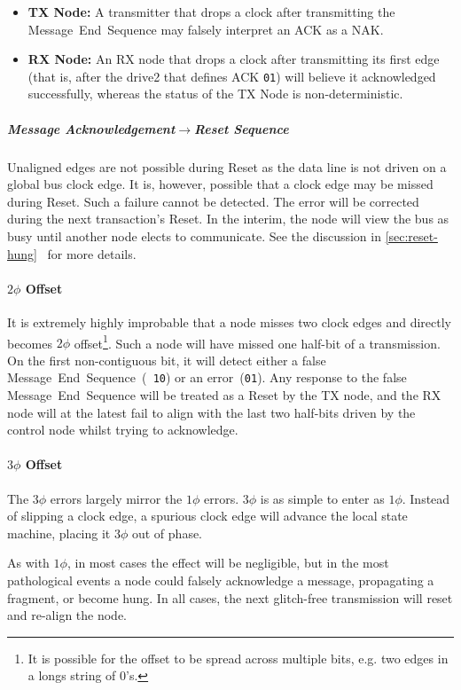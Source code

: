 \begin{itemize}
  \item {\bf TX Node:} A transmitter that drops a clock after transmitting the
Message~End~Sequence may falsely interpret an ACK as a NAK.

  \item {\bf RX Node:} An RX node that drops a clock after transmitting its
first edge (that is, after the {\sc drive2} that defines ACK {\tt 01}) will
believe it acknowledged successfully, whereas the status of the TX Node is
non-deterministic.
\end{itemize}

\subparagraph{Message Acknowledgement$\rightarrow$Reset Sequence}
Unaligned edges are not possible during Reset as the data line is not driven
on a global bus clock edge. It is, however, possible that a clock edge may be
missed during Reset. Such a failure cannot be detected. The error will be
corrected during the next transaction's Reset. In the interim, the node will
view the bus as busy until another node elects to communicate. See the
discussion in \ref{sec:reset-hung}~ for more details.


\paragraph{$2\phi$ Offset}
It is extremely highly improbable that a node misses two clock edges and
directly becomes $2\phi$ offset\footnote{
  It is possible for the offset to be spread across multiple bits, e.g.
  two edges in a longs string of 0's.}.
Such a node will have missed one half-bit of a transmission. On the first
non-contiguous bit, it will detect either a false Message~End~Sequence~({\tt
10}) or an error~({\tt 01}). Any response to the false Message~End~Sequence
will be treated as a Reset by the TX node, and the RX node will at the latest
fail to align with the last two half-bits driven by the control node whilst
trying to acknowledge.

\paragraph{$3\phi$ Offset}
The $3\phi$ errors largely mirror the $1\phi$ errors. $3\phi$ is as simple to
enter as $1\phi$. Instead of slipping a clock edge, a spurious clock edge will
advance the local state machine, placing it $3\phi$ out of phase.

As with $1\phi$, in most cases the effect will be negligible, but in the most
pathological events a node could falsely acknowledge a message, propagating a
fragment, or become hung. In all cases, the next glitch-free transmission will
reset and re-align the node.

